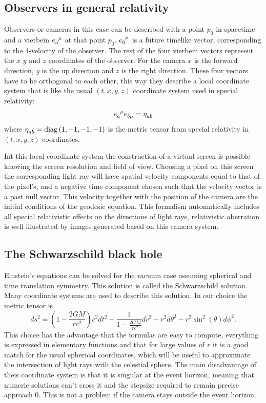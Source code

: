 \documentclass[pdftex,12pt,a4paper]{article}
\begin{document}
	\subsection{Observers in general relativity}
		Observers or cameras in this case can be described with a point $p_0$ in spacetime and a vierbein $\tensor{e}{_a^\mu}$ at that point $p_0$. $\tensor{e}{_0^\mu}$ is a future timelike vector, corresponding to the 4-velocity of the observer. The rest of the four vierbein vectors represent the $x$ $y$ and $z$ coordinates of the observer. For the camera $x$ is the forward direction, $y$ is the up direction and $z$ is the right direction. These four vectors have to be orthogonal to each other, this way they describe a local coordinate system that is like the usual $(t,x,y,z)$ coordinate system used in special relativity:
		\begin{equation}
			\tensor{e}{_a^\mu}\tensor{e}{_b_\mu} = \tensor{\eta}{_a_b}
			\label{viebein}
		\end{equation}
		where $\tensor{\eta}{_a_b} = \mathrm{diag}\left(1,-1,-1,-1\right)$ is the metric tensor from special relativity in $(t,x,y,z)$ coordinates.
		
		Int this local coordinate system the construction of a virtual screen is possible knowing the screen resolution and field of view. Choosing a pixel on this screen the corresponding light ray will have spatial velocity components equal to that of the pixel's, and a negative time component chosen such that the velocity vector is a past null vector. This velocity together with the position of the camera are the initial conditions of the geodesic equation. This formalism automatically includes all special relativistic effects on the directions of light rays, relativistic aberration is well illustrated by images generated based on this camera system.
	\subsection{The Schwarzschild black hole}
		Einstein's equations can be solved for the vacuum case assuming spherical and time translation symmetry. This solution is called the Schwarzschild solution. Many coordinate systems are used to describe this solution. In our choice the metric tensor is
		\begin{equation}
			ds^2=\left(1-\frac{2GM}{rc^2}\right)c^2dt^2 - \frac{1}{1-\frac{2GM}{rc^2}}dr^2 - r^2d\theta^2 - r^2\sin^2\left(\theta\right)d\phi^2.
		\end{equation}
		This choice has the advantage that the formulas are easy to compute, everything is expressed in elementary functions and that for large values of $r$ it is a good match for the usual spherical coordinates, which will be useful to approximate the intersection of light rays with the celestial sphere. The main disadvantage of theis coordinate system is that it is singular at the event horizon, meaning that numeric solutions can't cross it and the stepsize required to remain precise approach 0. This is not a problem if the camera stays outside the event horizon.
		
\end{document}
